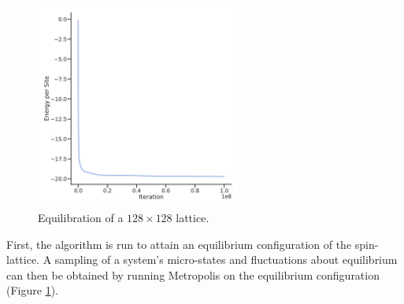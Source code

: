 \documentclass[11pt]{article}
\begin{document}
    \begin{figure}
        \centering
        \includegraphics[width=0.6\textwidth]{../Python/eq.pdf}

        \caption{Equilibration of a $128 \times 128$ lattice. }
        \label{fig:eq}
    \end{figure}

First, the algorithm is run to attain an equilibrium configuration of the spin-lattice.
A sampling of a system's micro-states and fluctuations about equilibrium can then be obtained
by running Metropolis on the equilibrium configuration (Figure \ref{fig:eq}).
\end{document}
